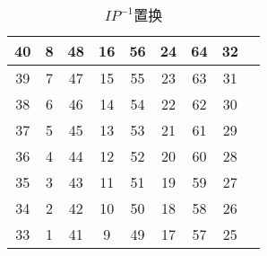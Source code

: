 \documentclass[UTF8]{ctexart}
\begin{document}
\begin{itemize}
\begin{itemize}
            \begin{table}[h]  %
            \centering  %
            \caption{$IP^{-1}$置换}  %
                \begin{tabular}{|c|c|c|c|c|c|c|c|c|}  %
                    \hline
                    40 &8 &48 &16 &56 &24 &64 &32\\
                    \hline
                    39 &7 &47 &15 &55 &23 &63 &31\\
                    \hline
                    38 &6 &46 &14 &54 &22 &62 &30\\
                    \hline
                    37 &5 &45 &13 &53 &21 &61 &29\\
                    \hline
                    36 &4 &44 &12 &52 &20 &60 &28\\
                    \hline
                    35 &3 &43 &11 &51 &19 &59 &27\\
                    \hline
                    34 &2 &42 &10 &50 &18 &58 &26\\
                    \hline
                    33 &1 &41 &9  &49 &17 &57 &25\\
                    \hline
                \end{tabular}
            \end{table}
        \end{itemize}
    \end{itemize}
\end{document}
